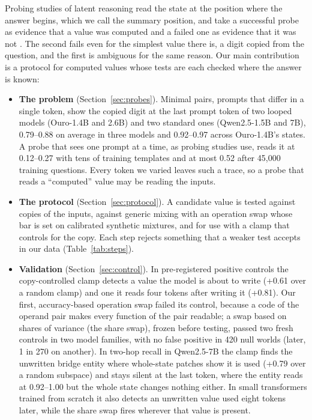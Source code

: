 \documentclass{article}
\begin{document}
Probing studies of latent reasoning read the state at the position where the answer begins, which we call the summary position, and take a successful probe as evidence that a value was computed and a failed one as evidence that it was not \citep{lu2025,yu2024,kudo2026}. The second fails even for the simplest value there is, a digit copied from the question, and the first is ambiguous for the same reason. Our main contribution is a protocol for computed values whose tests are each checked where the answer is known:
\begin{itemize}
\item \textbf{The problem} (Section~\ref{sec:probes}). Minimal pairs, prompts that differ in a single token, show the copied digit at the last prompt token of two looped models (Ouro-1.4B and 2.6B) and two standard ones (Qwen2.5-1.5B and 7B), 0.79--0.88 on average in three models and 0.92--0.97 across Ouro-1.4B's states. A probe that sees one prompt at a time, as probing studies use, reads it at 0.12--0.27 with tens of training templates and at most 0.52 after 45,000 training questions. Every token we varied leaves such a trace, so a probe that reads a ``computed'' value may be reading the inputs.
\item \textbf{The protocol} (Section~\ref{sec:protocol}). A candidate value is tested against copies of the inputs, against generic mixing with an operation swap whose bar is set on calibrated synthetic mixtures, and for use with a clamp that controls for the copy. Each step rejects something that a weaker test accepts in our data (Table~\ref{tab:steps}).
\item \textbf{Validation} (Section~\ref{sec:control}). In pre-registered positive controls the copy-controlled clamp detects a value the model is about to write (+0.61 over a random clamp) and one it reads four tokens after writing it (+0.81). Our first, accuracy-based operation swap failed its control, because a code of the operand pair makes every function of the pair readable; a swap based on shares of variance (the share swap), frozen before testing, passed two fresh controls in two model families, with no false positive in 420 null worlds (later, 1 in 270 on another). In two-hop recall in Qwen2.5-7B the clamp finds the unwritten bridge entity where whole-state patches show it is used (+0.79 over a random subspace) and stays silent at the last token, where the entity reads at 0.92--1.00 but the whole state changes nothing either. In small transformers trained from scratch it also detects an unwritten value used eight tokens later, while the share swap fires wherever that value is present.

\end{itemize}
\end{document}
